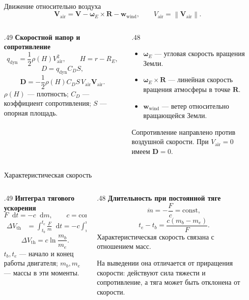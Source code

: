 \documentclass[11pt,aspectratio=169,t]{beamer}
\newcommand{\eqcompact}{\fontsize{10}{12}\selectfont}
\newcommand{\derivationmathspacing}{%
  \setlength{\abovedisplayskip}{2pt}%
  \setlength{\belowdisplayskip}{3pt}%
  \setlength{\abovedisplayshortskip}{2pt}%
  \setlength{\belowdisplayshortskip}{2pt}%
  \setlength{\jot}{2pt}}
\newcommand{\vect}[1]{\boldsymbol{#1}}
\newcommand{\dd}{\mathop{}\!\mathrm d}
\newcommand{\norm}[1]{\left\lVert#1\right\rVert}
\begin{document}
\begin{frame}{Движение относительно воздуха}
\relax\derivationmathspacing
{\eqcompact
\[
 \vect V_{\mathrm{air}}=\vect V-\vect\omega_E\times\vect R-\vect w_{\mathrm{wind}},
 \qquad V_{\mathrm{air}}=\norm{\vect V_{\mathrm{air}}}.
\]
}
\begin{columns}[T,onlytextwidth]
\begin{column}{.49\textwidth}
\textbf{Скоростной напор и сопротивление}
{\eqcompact
\[
 q_{\mathrm{dyn}}=\frac12\rho(H)V_{\mathrm{air}}^2,
 \qquad H=r-R_E,
\]
\[
 D=q_{\mathrm{dyn}}C_DS,
\]
\[
 \vect D=-\frac12\rho(H)C_DS\,
                  V_{\mathrm{air}}\vect V_{\mathrm{air}}.
\]
}
$\rho(H)$ --- плотность; $C_D$ --- коэффициент сопротивления;
$S$ --- опорная площадь.
\end{column}
\begin{column}{.48\textwidth}
\begin{itemize}
\setlength{\itemsep}{3pt}
 \item $\vect\omega_E$ --- угловая скорость вращения Земли.
 \item $\vect\omega_E\times\vect R$ --- линейная скорость вращения атмосферы в точке $\vect R$.
 \item $\vect w_{\mathrm{wind}}$ --- ветер относительно вращающейся Земли.
\end{itemize}
\smallskip
Сопротивление направлено против воздушной скорости.
При $V_{\mathrm{air}}=0$ имеем $\vect D=0$.
\end{column}
\end{columns}
\end{frame}

\begin{frame}{Характеристическая скорость}
\relax\derivationmathspacing
\begin{columns}[T,onlytextwidth]
\begin{column}{.49\textwidth}
\textbf{Интеграл тягового ускорения}
{\eqcompact
\[
 F\dd t=-c\dd m,\qquad c=\mathrm{const},
\]
\[
 \begin{aligned}
 \Delta V_{\mathrm{th}}
 &=\int_{t_b}^{t_e}\frac Fm\dd t
 =-c\int_{m_b}^{m_e}\frac{\dd m}{m}.
 \end{aligned}
\]
\[
 \boxed{\Delta V_{\mathrm{th}}=c\ln\frac{m_b}{m_e}.}
\]
}
$t_b,t_e$ --- начало и конец работы двигателя;
$m_b,m_e$ --- массы в эти моменты.
\end{column}
\begin{column}{.48\textwidth}
\textbf{Длительность при постоянной тяге}
{\eqcompact
\[
 \dot m=-\frac Fc=\mathrm{const},
\]
\[
 \boxed{t_e-t_b=\frac{c(m_b-m_e)}F.}
\]
}
Характеристическая скорость связана с отношением масс.
\par\smallskip
На выведении она отличается от приращения скорости:
действуют сила тяжести и сопротивление,
а тяга может быть отклонена от скорости.
\end{column}
\end{columns}
\end{frame}
\end{document}

